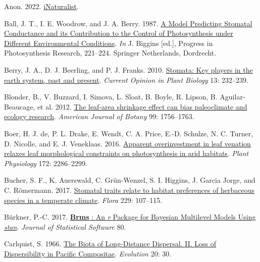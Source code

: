 \documentclass[
  letterpaper,
  DIV=11,
  numbers=noendperiod]{scrartcl}
\newlength{\cslhangindent}
\newlength{\cslentryspacingunit} %
\newenvironment{CSLReferences}[2] %
 {%
  \setlength{\parindent}{0pt}
  \ifodd #1
  \let\oldpar\par
  \def\par{\hangindent=\cslhangindent\oldpar}
  \fi
  \setlength{\parskip}{#2\cslentryspacingunit}
 }%
 {}
\begin{document}
\hypertarget{refs}{}
\begin{CSLReferences}{1}{0}
\leavevmode{}%
Anon. 2022. \href{https://www.inaturalist.org}{{iNaturalist}}.

\leavevmode{}%
Ball, J. T., I. E. Woodrow, and J. A. Berry. 1987.
\href{https://doi.org/10.1007/978-94-017-0519-6_48}{A {Model}
{Predicting} {Stomatal} {Conductance} and its {Contribution} to the
{Control} of {Photosynthesis} under {Different} {Environmental}
{Conditions}}. \emph{In} J. Biggins {[}ed.{]}, Progress in
{Photosynthesis} {Research}, 221--224. Springer Netherlands, Dordrecht.

\leavevmode{}%
Berry, J. A., D. J. Beerling, and P. J. Franks. 2010.
\href{https://doi.org/10.1016/j.pbi.2010.04.013}{Stomata: Key players in
the earth system, past and present}. \emph{Current Opinion in Plant
Biology} 13: 232--239.

\leavevmode{}%
Blonder, B., V. Buzzard, I. Simova, L. Sloat, B. Boyle, R. Lipson, B.
Aguilar-Beaucage, et al. 2012.
\href{https://doi.org/10.3732/ajb.1200062}{The leaf-area shrinkage
effect can bias paleoclimate and ecology research}. \emph{American
Journal of Botany} 99: 1756--1763.

\leavevmode{}%
Boer, H. J. de, P. L. Drake, E. Wendt, C. A. Price, E.-D. Schulze, N. C.
Turner, D. Nicolle, and E. J. Veneklaas. 2016.
\href{https://doi.org/10.1104/pp.16.01313}{Apparent overinvestment in
leaf venation relaxes leaf morphological constraints on photosynthesis
in arid habitats}. \emph{Plant Physiology} 172: 2286--2299.

\leavevmode{}%
Bucher, S. F., K. Auerswald, C. Grün-Wenzel, S. I. Higgins, J. Garcia
Jorge, and C. Römermann. 2017.
\href{https://doi.org/10.1016/j.flora.2017.02.011}{Stomatal traits
relate to habitat preferences of herbaceous species in a temperate
climate}. \emph{Flora} 229: 107--115.

\leavevmode{}%
Bürkner, P.-C. 2017.
\href{https://doi.org/10.18637/jss.v080.i01}{\textbf{Brms} : {An}
\emph{r} {Package} for {Bayesian} {Multilevel} {Models} {Using}
\emph{stan}}. \emph{Journal of Statistical Software} 80.

\leavevmode{}%
Carlquist, S. 1966. \href{https://doi.org/10.2307/2406147}{The {Biota}
of {Long}-{Distance} {Dispersal}. {II}. {Loss} of {Dispersibility} in
{Pacific} {Compositae}}. \emph{Evolution} 20: 30.


\end{CSLReferences}
\end{document}
